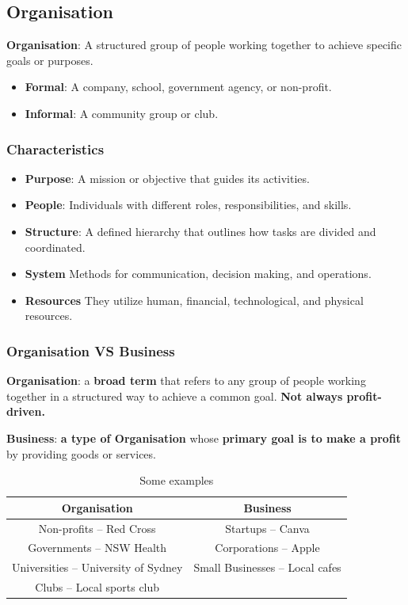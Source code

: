 \subsection{Organisation}

\textbf{Organisation}: A structured group of people working together to achieve specific goals or purposes.

\begin{itemize}
    \item \textbf{Formal}: A company, school, government agency, or non-profit.
    \item \textbf{Informal}: A community group or club.
\end{itemize}

\subsubsection{Characteristics}

\begin{itemize}
    \item \textbf{Purpose}: A mission or objective that guides its activities.
    \item \textbf{People}: Individuals with different roles, responsibilities, and skills.
    \item \textbf{Structure}: A defined hierarchy that outlines how tasks are divided and coordinated.
    \item \textbf{System} Methods for communication, decision making, and operations.
    \item \textbf{Resources} They utilize human, financial, technological, and physical resources.
\end{itemize}

\subsubsection{Organisation VS Business}

\indent

\textbf{Organisation}: a \textbf{broad term} that refers to any group of people working together in a structured way to achieve a common goal. \textbf{Not always profit-driven.}

\textbf{Business}: \textbf{a type of Organisation} whose \textbf{primary goal is to make a profit} by providing goods or services.

\begin{table}[h]
    \centering
    \begin{tabular}{c|c}
        \hline
        Organisation & Business \\\hline
        Non-profits – Red Cross & Startups – Canva\\
        Governments – NSW Health & Corporations – Apple\\
        Universities – University of Sydney & Small Businesses – Local cafes\\
        Clubs – Local sports club & \\\hline
    \end{tabular}
    \caption{Some examples}
\end{table}

